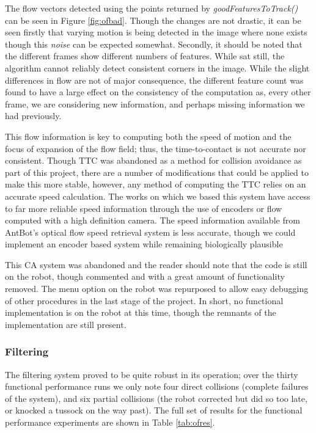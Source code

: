 \documentclass[a4paper,11pt,twoside,openright]{article}
\begin{document}
The flow vectors detected using the points returned by \textit{goodFeaturesToTrack()} can be seen in Figure \ref{fig:ofbad}.
Though the changes are not drastic, it can be seen firstly that varying motion is being detected in the image where none
exists though this \textit{noise} can be expected somewhat. Secondly, it should be noted that the different frames show different numbers
of features. While sat still, the algorithm cannot reliably detect consistent corners in the image. While the slight
differences in flow are not of major consequence, the different feature count was found to have a large effect
on the consistency of the computation as, every other frame, we are considering new information, and perhaps missing information
we had previously.
\newline

This flow information is key to computing both the speed of motion and the focus of expansion of the flow field; thus, the
time-to-contact is not accurate nor consistent. Though TTC was abandoned as a method for collision avoidance as part of this
project, there are a number of modifications that could be applied to make this more stable, however, any method of computing the
TTC relies on an accurate speed calculation. The works on which we based this system have access to far more reliable speed information
through the use of encoders or flow computed with a high definition camera. The speed information available from AntBot's optical
flow speed retrieval system is less accurate, though we could implement an encoder based system while remaining biologically
plausible \cite{Wittlinger1965}
\newline

This CA system was abandoned and the reader should note that the code is still on the robot, though commented and with
a great amount of functionality removed. The menu option on the robot was repurposed to allow easy debugging of other procedures
in the last stage of the project. In short, no functional implementation is on the robot at this time, though the remnants of
the implementation are still present.

\subsubsection{Filtering}
The filtering system proved to be quite robust in its operation; over the thirty functional performance runs we only note four direct
collisions (complete failures of the system), and six partial collisions (the robot corrected but did so too late, or knocked a
tussock on the way past). The full set of results for the functional performance experiments are shown in Table \ref{tab:ofres}.
\end{document}
